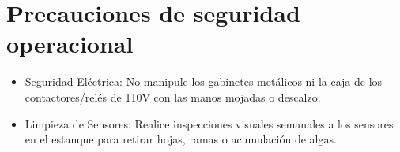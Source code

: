 \documentclass[12pt,letterpaper]{article}     %
\begin{document}
\section{Precauciones de seguridad operacional}
\begin{itemize}
    \item Seguridad Eléctrica: No manipule los gabinetes metálicos ni la caja de los contactores/relés de 110V con las manos mojadas o descalzo.

    \item Limpieza de Sensores: Realice inspecciones visuales semanales a los sensores en el estanque para retirar hojas, ramas o acumulación de algas.


\end{itemize}
\end{document}

